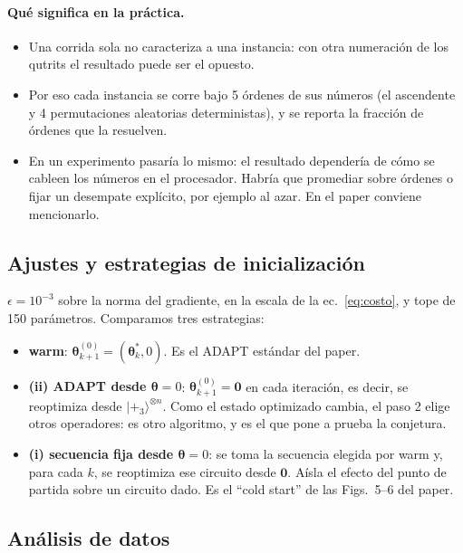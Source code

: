 \documentclass[11pt,a4paper]{article}
\renewcommand{\ket}[1]{|#1\rangle}
\begin{document}
\paragraph{Qué significa en la práctica.}
\begin{itemize}
\item Una corrida sola no caracteriza a una instancia: con otra numeración de los qutrits el
  resultado puede ser el opuesto.
\item Por eso cada instancia se corre bajo 5 órdenes de sus números (el ascendente y 4
  permutaciones aleatorias deterministas), y se reporta la fracción de órdenes que la resuelven.
\item En un experimento pasaría lo mismo: el resultado dependería de cómo se cableen los números en
  el procesador. Habría que promediar sobre órdenes o fijar un desempate explícito, por ejemplo al
  azar. En el paper conviene mencionarlo.
\end{itemize}

\subsection{Ajustes y estrategias de inicialización}
\label{sec:estrategias-def}

$\epsilon=10^{-3}$ sobre la norma del gradiente, en la escala de la ec.~\eqref{eq:costo}, y tope de
150 parámetros. Comparamos tres estrategias:
\begin{itemize}
\item \textbf{warm}: $\bm\theta_{k+1}^{(0)}=(\bm\theta^*_k,0)$. Es el ADAPT estándar del paper.
\item \textbf{(ii) ADAPT desde $\bm\theta=0$}: $\bm\theta_{k+1}^{(0)}=\bm0$ en cada iteración,
  es decir, se reoptimiza desde $\ket{+_3}^{\otimes n}$. Como el estado optimizado cambia, el paso
  2 elige otros operadores: es otro algoritmo, y es el que pone a prueba la conjetura.
\item \textbf{(i) secuencia fija desde $\bm\theta=0$}: se toma la secuencia elegida por warm y,
  para cada $k$, se reoptimiza ese circuito desde $\bm0$. Aísla el efecto del punto de partida
  sobre un circuito dado. Es el ``cold start'' de las Figs.~5--6 del paper.
\end{itemize}

\subsection{Análisis de datos}
\label{sec:analisis}
\end{document}
